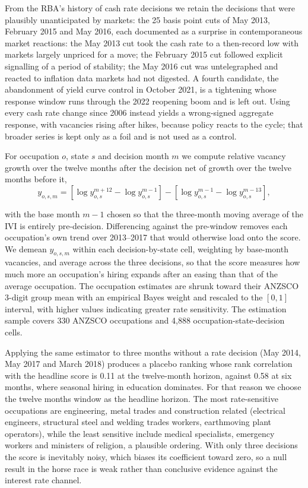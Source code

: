\documentclass[11pt]{article}
\begin{document}
From the RBA's history of cash rate decisions \citep{rba_cash_rate} we retain the decisions that were plausibly unanticipated by markets: the 25 basis point cuts of May 2013, February 2015 and May 2016, each documented as a surprise in contemporaneous market reactions: the May 2013 cut took the cash rate to a then-record low with markets largely unpriced for a move; the February 2015 cut followed explicit signalling of a period of stability; the May 2016 cut was untelegraphed and reacted to inflation data markets had not digested. A fourth candidate, the abandonment of yield curve control in October 2021, is a tightening whose response window runs through the 2022 reopening boom and is left out. Using every cash rate change since 2006 instead yields a wrong-signed aggregate response, with vacancies rising after hikes, because policy reacts to the cycle; that broader series is kept only as a foil and is not used as a control.

For occupation $o$, state $s$ and decision month $m$ we compute relative vacancy growth over the twelve months after the decision net of growth over the twelve months before it,
\begin{equation}
    y_{o,s,m} = \left[\log{y^{m+12}_{o,s}} - \log{y^{m-1}_{o,s}}\right] - \left[\log{y^{m-1}_{o,s}} - \log{y^{m-13}_{o,s}}\right],
\label{eq:rba_lp}
\end{equation}

with the base month $m-1$ chosen so that the three-month moving average of the IVI is entirely pre-decision. Differencing against the pre-window removes each occupation's own trend over 2013--2017 that would otherwise load onto the score. We demean $y_{o,s,m}$ within each decision-by-state cell, weighting by base-month vacancies, and average across the three decisions, so that the score measures how much more an occupation's hiring expands after an easing than that of the average occupation. The occupation estimates are shrunk toward their ANZSCO 3-digit group mean with an empirical Bayes weight and rescaled to the $[0,1]$ interval, with higher values indicating greater rate sensitivity. The estimation sample covers 330 ANZSCO occupations and 4,888 occupation-state-decision cells.

Applying the same estimator to three months without a rate decision (May 2014, May 2017 and March 2018) produces a placebo ranking whose rank correlation with the headline score is 0.11 at the twelve-month horizon, against 0.58 at six months, where seasonal hiring in education dominates. For that reason we choose the twelve months window as the headline horizon. The most rate-sensitive occupations are engineering, metal trades and construction related (electrical engineers, structural steel and welding trades workers, earthmoving plant operators), while the least sensitive include medical specialists, emergency workers and ministers of religion, a plausible ordering. With only three decisions the score is inevitably noisy, which biases its coefficient toward zero, so a null result in the horse race is weak rather than conclusive evidence against the interest rate channel.
\end{document}
